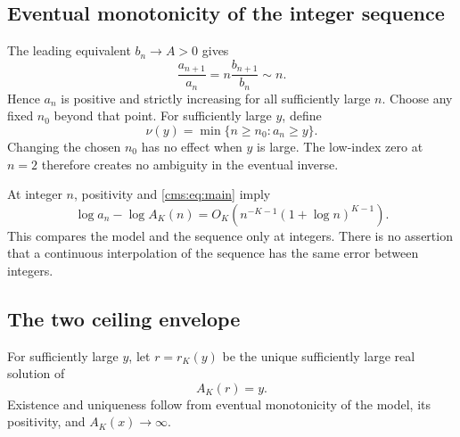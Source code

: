 \subsection{Eventual monotonicity of the integer sequence}
The leading equivalent $b_n\to A>0$ gives
\begin{equation}\label{cms:eq:ratio}
\frac{a_{n+1}}{a_n}=n\frac{b_{n+1}}{b_n}\sim n.
\end{equation}
Hence $a_n$ is positive and strictly increasing for all sufficiently large $n$. Choose any fixed $n_0$ beyond that point. For sufficiently large $y$, define
\begin{equation}\label{cms:eq:nu}
\nu(y)=\min\{n\geq n_0:a_n\geq y\}.
\end{equation}
Changing the chosen $n_0$ has no effect when $y$ is large. The low-index zero at $n=2$ therefore creates no ambiguity in the eventual inverse.

At integer $n$, positivity and \eqref{cms:eq:main} imply
\begin{equation}\label{cms:eq:logerror}
\log a_n-\log A_K(n)
=O_K\!\left(n^{-K-1}(1+\log n)^{K-1}\right).
\end{equation}
This compares the model and the sequence only at integers. There is no assertion that a continuous interpolation of the sequence has the same error between integers.

\subsection{The two ceiling envelope}
For sufficiently large $y$, let $r=r_K(y)$ be the unique sufficiently large real solution of
\begin{equation}\label{cms:eq:r}
A_K(r)=y.
\end{equation}
Existence and uniqueness follow from eventual monotonicity of the model, its positivity, and $A_K(x)\to\infty$.

